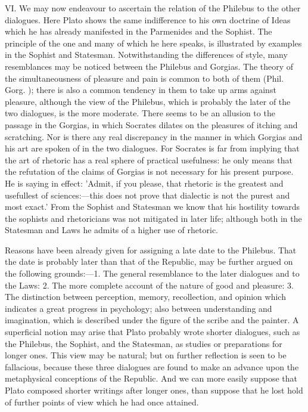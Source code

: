 \documentclass[11pt,letter]{article}
\begin{document}
\par  VI. We may now endeavour to ascertain the relation of the Philebus to the other dialogues. Here Plato shows the same indifference to his own doctrine of Ideas which he has already manifested in the Parmenides and the Sophist. The principle of the one and many of which he here speaks, is illustrated by examples in the Sophist and Statesman. Notwithstanding the differences of style, many resemblances may be noticed between the Philebus and Gorgias. The theory of the simultaneousness of pleasure and pain is common to both of them (Phil. Gorg. ); there is also a common tendency in them to take up arms against pleasure, although the view of the Philebus, which is probably the later of the two dialogues, is the more moderate. There seems to be an allusion to the passage in the Gorgias, in which Socrates dilates on the pleasures of itching and scratching. Nor is there any real discrepancy in the manner in which Gorgias and his art are spoken of in the two dialogues. For Socrates is far from implying that the art of rhetoric has a real sphere of practical usefulness: he only means that the refutation of the claims of Gorgias is not necessary for his present purpose. He is saying in effect: 'Admit, if you please, that rhetoric is the greatest and usefullest of sciences:—this does not prove that dialectic is not the purest and most exact.' From the Sophist and Statesman we know that his hostility towards the sophists and rhetoricians was not mitigated in later life; although both in the Statesman and Laws he admits of a higher use of rhetoric.

\par  Reasons have been already given for assigning a late date to the Philebus. That the date is probably later than that of the Republic, may be further argued on the following grounds:—1. The general resemblance to the later dialogues and to the Laws: 2. The more complete account of the nature of good and pleasure: 3. The distinction between perception, memory, recollection, and opinion which indicates a great progress in psychology; also between understanding and imagination, which is described under the figure of the scribe and the painter. A superficial notion may arise that Plato probably wrote shorter dialogues, such as the Philebus, the Sophist, and the Statesman, as studies or preparations for longer ones. This view may be natural; but on further reflection is seen to be fallacious, because these three dialogues are found to make an advance upon the metaphysical conceptions of the Republic. And we can more easily suppose that Plato composed shorter writings after longer ones, than suppose that he lost hold of further points of view which he had once attained.
\end{document}
